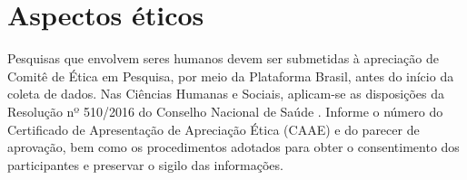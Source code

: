 \section{Aspectos éticos}
\label{sec:etica}

Pesquisas que envolvem seres humanos devem ser submetidas à apreciação de Comitê de Ética em Pesquisa, por meio da Plataforma Brasil, antes do início da coleta de dados. Nas Ciências Humanas e Sociais, aplicam-se as disposições da Resolução nº 510/2016 do Conselho Nacional de Saúde \cite{brasil2016}. Informe o número do Certificado de Apresentação de Apreciação Ética (CAAE) e do parecer de aprovação, bem como os procedimentos adotados para obter o consentimento dos participantes e preservar o sigilo das informações.

